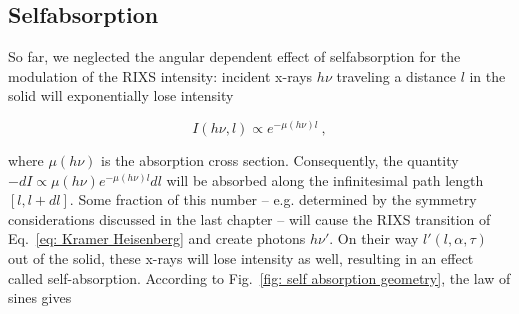 \documentclass[twocolumn,prb,twocolumn,amsmath,superscriptaddress,nofootinbib,amssymb]{revtex4-1}
\begin{document}
\begin{widetext}




\section{Selfabsorption}

So far, we neglected the angular dependent effect of selfabsorption for the modulation of the RIXS intensity: incident x-rays $h\nu$ traveling a distance $l$ in the solid will exponentially lose intensity

\begin{equation}
I(h\nu,l)\propto e^{-\mu(h\nu) l}~,
\end{equation}

\noindent where $\mu(h\nu)$ is the absorption cross section. Consequently, the quantity $-dI\propto\mu(h\nu) e^{-\mu(h\nu) l}dl$ will be absorbed along the infinitesimal path length $[l,l+dl]$. Some fraction of this number -- e.g. determined by the symmetry considerations discussed in the last chapter -- will cause the RIXS transition of Eq.~\ref{eq: Kramer Heisenberg} and create photons $h\nu'$. On their way $l'(l,\alpha,\tau)$ out of the solid, these x-rays will lose intensity as well, resulting in an effect called self-absorption. According to Fig.~\ref{fig: self absorption geometry}, the law of sines gives

\begin{figure*}[htbp]
\begin{center}
\end{center}
\end{figure*}
\end{widetext}
\end{document}
